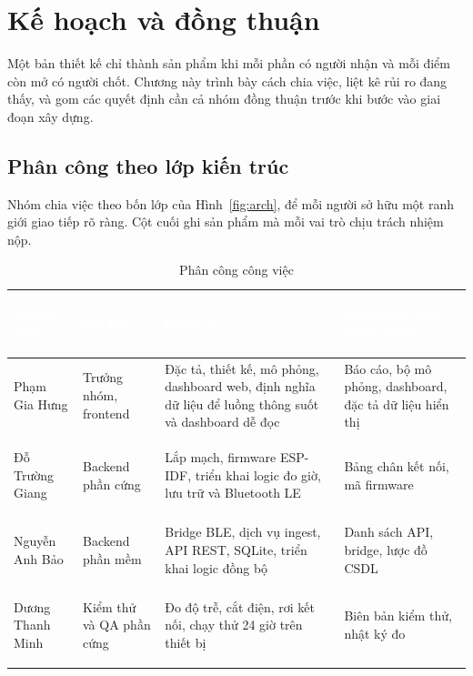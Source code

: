 \chapter{Kế hoạch và đồng thuận}

Một bản thiết kế chỉ thành sản phẩm khi mỗi phần có người nhận và mỗi điểm còn mở có người chốt. Chương này trình bày cách chia việc, liệt kê rủi ro đang thấy, và gom các quyết định cần cả nhóm đồng thuận trước khi bước vào giai đoạn xây dựng.

\section{Phân công theo lớp kiến trúc}
Nhóm chia việc theo bốn lớp của Hình~\ref{fig:arch}, để mỗi người sở hữu một ranh giới giao tiếp rõ ràng. Cột cuối ghi sản phẩm mà mỗi vai trò chịu trách nhiệm nộp.

\begin{table}[H]
    \centering
    \small
    \renewcommand{\arraystretch}{1.4}
    \caption{Phân công công việc}
    \label{tab:roles}
    \begin{tabular}{>{\bfseries\raggedright\arraybackslash}m{3.0cm} >{\raggedright\arraybackslash}m{3.0cm} >{\raggedright\arraybackslash}m{4.0cm} >{\raggedright\arraybackslash}m{4.0cm}}
        \toprule
        \rowcolor{haitayblue}
        \textcolor{white}{Thành viên} & \textcolor{white}{Vai trò} & \textcolor{white}{Phạm vi} & \textcolor{white}{Sản phẩm chịu trách nhiệm} \\
        \midrule
        \rowcolor{haitayblue!8}
        Phạm Gia Hưng & Trưởng nhóm, frontend & Đặc tả, thiết kế, mô phỏng, dashboard web, định nghĩa dữ liệu để luồng thông suốt và dashboard dễ đọc & Báo cáo, bộ mô phỏng, dashboard, đặc tả dữ liệu hiển thị \\
        Đỗ Trường Giang & Backend phần cứng & Lắp mạch, firmware ESP-IDF, triển khai logic đo giờ, lưu trữ và Bluetooth LE & Bảng chân kết nối, mã firmware \\
        \rowcolor{haitayblue!8}
        Nguyễn Anh Bảo & Backend phần mềm & Bridge BLE, dịch vụ ingest, API REST, SQLite, triển khai logic đồng bộ & Danh sách API, bridge, lược đồ CSDL \\
        Dương Thanh Minh & Kiểm thử và QA phần cứng & Đo độ trễ, cắt điện, rơi kết nối, chạy thử 24 giờ trên thiết bị & Biên bản kiểm thử, nhật ký đo \\
        \bottomrule
    \end{tabular}
\end{table}

